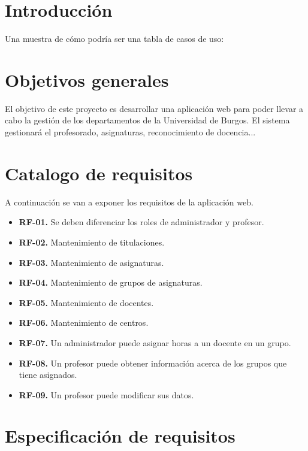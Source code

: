 
\section{Introducción}
Una muestra de cómo podría ser una tabla de casos de uso:


\section{Objetivos generales}
El objetivo de este proyecto es desarrollar una aplicación web para poder llevar a cabo la gestión de los departamentos de la Universidad de Burgos. El sistema gestionará el profesorado, asignaturas, reconocimiento de docencia...

\section{Catalogo de requisitos}
A continuación se van a exponer los requisitos de la aplicación web.

\begin{itemize}
	\item \textbf{RF-01.} Se deben diferenciar los roles de administrador y profesor.
	\item \textbf{RF-02.} Mantenimiento de titulaciones.
	\item \textbf{RF-03.} Mantenimiento de asignaturas.
	\item \textbf{RF-04.} Mantenimiento de grupos de asignaturas.
	\item \textbf{RF-05.} Mantenimiento de docentes.
	\item \textbf{RF-06.} Mantenimiento de centros.
	\item \textbf{RF-07.} Un administrador puede asignar horas a un docente en un grupo.
	\item \textbf{RF-08.} Un profesor puede obtener información acerca de los grupos que tiene asignados.
	\item \textbf{RF-09.} Un profesor puede modificar sus datos.
\end{itemize}

\section{Especificación de requisitos}
